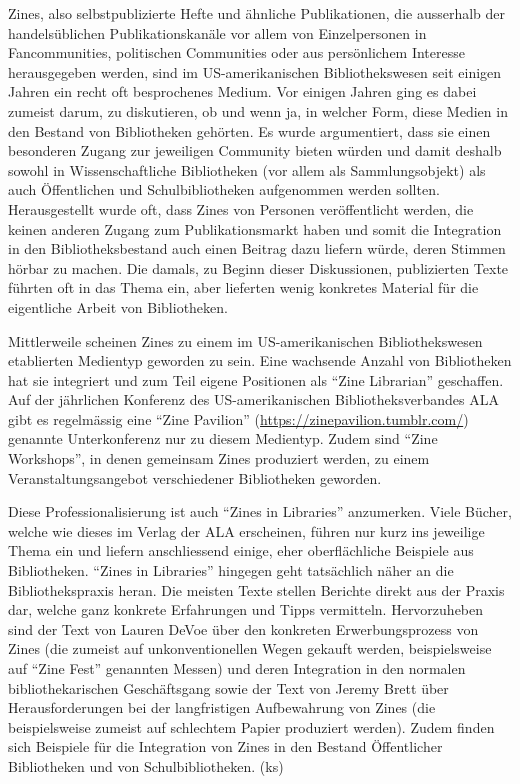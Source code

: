\documentclass[a4paper,
fontsize=11pt,
oneside,
numbers=noperiodatend,
parskip=half-,
bibliography=totoc,
final
]{scrartcl}
\begin{document}
Zines, also selbstpublizierte Hefte und ähnliche Publikationen, die
ausserhalb der handelsüblichen Publikationskanäle vor allem von
Einzelpersonen in Fancommunities, politischen Communities oder aus
persönlichem Interesse herausgegeben werden, sind im US-amerikanischen
Bibliothekswesen seit einigen Jahren ein recht oft besprochenes Medium.
Vor einigen Jahren ging es dabei zumeist darum, zu diskutieren, ob und
wenn ja, in welcher Form, diese Medien in den Bestand von Bibliotheken
gehörten. Es wurde argumentiert, dass sie einen besonderen Zugang zur
jeweiligen Community bieten würden und damit deshalb sowohl in
Wissenschaftliche Bibliotheken (vor allem als Sammlungsobjekt) als auch
Öffentlichen und Schulbibliotheken aufgenommen werden sollten.
Herausgestellt wurde oft, dass Zines von Personen veröffentlicht werden,
die keinen anderen Zugang zum Publikationsmarkt haben und somit die
Integration in den Bibliotheksbestand auch einen Beitrag dazu liefern
würde, deren Stimmen hörbar zu machen. Die damals, zu Beginn dieser
Diskussionen, publizierten Texte führten oft in das Thema ein, aber
lieferten wenig konkretes Material für die eigentliche Arbeit von
Bibliotheken.

Mittlerweile scheinen Zines zu einem im US-amerikanischen
Bibliothekswesen etablierten Medientyp geworden zu sein. Eine wachsende
Anzahl von Bibliotheken hat sie integriert und zum Teil eigene
Positionen als \enquote{Zine Librarian} geschaffen. Auf der jährlichen
Konferenz des US-amerikanischen Bibliotheksverbandes ALA gibt es
regelmässig eine \enquote{Zine Pavilion}
(\url{https://zinepavilion.tumblr.com/}) genannte Unterkonferenz nur zu
diesem Medientyp. Zudem sind \enquote{Zine Workshops}, in denen
gemeinsam Zines produziert werden, zu einem Veranstaltungsangebot
verschiedener Bibliotheken geworden.

Diese Professionalisierung ist auch \enquote{Zines in Libraries}
anzumerken. Viele Bücher, welche wie dieses im Verlag der ALA
erscheinen, führen nur kurz ins jeweilige Thema ein und liefern
anschliessend einige, eher oberflächliche Beispiele aus Bibliotheken.
\enquote{Zines in Libraries} hingegen geht tatsächlich näher an die
Bibliothekspraxis heran. Die meisten Texte stellen Berichte direkt aus
der Praxis dar, welche ganz konkrete Erfahrungen und Tipps vermitteln.
Hervorzuheben sind der Text von Lauren DeVoe über den konkreten
Erwerbungsprozess von Zines (die zumeist auf unkonventionellen Wegen
gekauft werden, beispielsweise auf \enquote{Zine Fest} genannten Messen)
und deren Integration in den normalen bibliothekarischen Geschäftsgang
sowie der Text von Jeremy Brett über Herausforderungen bei der
langfristigen Aufbewahrung von Zines (die beispielsweise zumeist auf
schlechtem Papier produziert werden). Zudem finden sich Beispiele für
die Integration von Zines in den Bestand Öffentlicher Bibliotheken und
von Schulbibliotheken. (ks)
\end{document}
